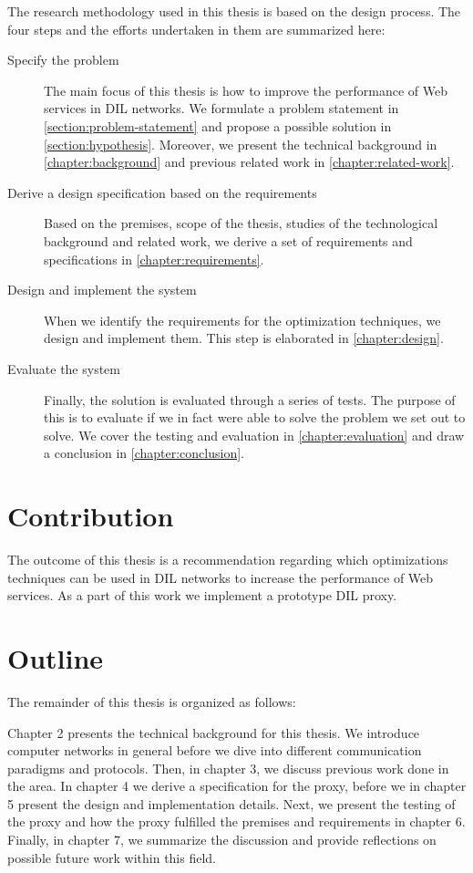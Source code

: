 The research methodology used in this thesis is based on the design process. The
four steps and the efforts undertaken in them are summarized here:

\begin{description}

    \item[Specify the problem] The main focus of this thesis is how to improve
    the performance of Web services in DIL networks. We formulate a problem
    statement in \cref{section:problem-statement} and propose a possible
    solution in \cref{section:hypothesis}. Moreover, we present the technical
    background in \cref{chapter:background} and previous related work in
    \cref{chapter:related-work}.

    \item[Derive a design specification based on the requirements] Based on the
    premises, scope of the thesis, studies of the technological background and
    related work, we derive a set of requirements and specifications in
    \cref{chapter:requirements}.

    \item[Design and implement the system] When we identify the requirements for
    the optimization techniques, we design and implement them. This step is
    elaborated in \cref{chapter:design}.

    \item[Evaluate the system] Finally, the solution is evaluated through a
    series of tests. The purpose of this is to evaluate if we in fact were able
    to solve the problem we set out to solve. We cover the testing and
    evaluation in \cref{chapter:evaluation} and draw a conclusion in
    \cref{chapter:conclusion}.

\end{description}


\section{Contribution}

The outcome of this thesis is a recommendation regarding which optimizations
techniques can be used in DIL networks to increase the performance of Web
services. As a part of this work we implement a prototype DIL proxy.

\section{Outline}

The remainder of this thesis is organized as follows:

Chapter 2 presents the technical background for this thesis. We introduce
computer networks in general before we dive into different communication
paradigms and protocols. Then, in chapter 3, we discuss previous work done in
the area. In chapter 4 we derive a specification for the proxy, before we in
chapter 5 present the design and implementation details. Next, we present the
testing of the proxy and how the proxy fulfilled the premises and requirements
in chapter 6. Finally, in chapter 7, we summarize the discussion and provide
reflections on possible future work within this field.
